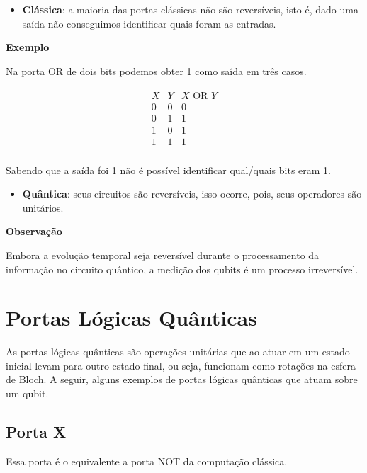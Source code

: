 \begin{itemize}
\tightlist
\item
  \textbf{Clássica}: a maioria das portas clássicas não são reversíveis,
  isto é, dado uma saída não conseguimos identificar quais foram as
  entradas.
\end{itemize}

\textbf{Exemplo}

Na porta OR de dois bits podemos obter 1 como saída em três casos.

\[\begin{aligned}
\begin{array}{cc|c}
    X & Y & X \text{ OR } Y \\
    0 & 0 & 0 \\
    0 & 1 & 1 \\
    1 & 0 & 1 \\
    1 & 1 & 1 \\
\end{array}
\end{aligned}\]

Sabendo que a saída foi 1 não é possível identificar qual/quais bits
eram 1.

\begin{itemize}
\tightlist
\item
  \textbf{Quântica}: seus circuitos são reversíveis, isso ocorre, pois,
  seus operadores são unitários.
\end{itemize}

\textbf{Observação}

Embora a evolução temporal seja reversível durante o processamento da
informação no circuito quântico, a medição dos qubits é um processo
irreversível.

\section{Portas Lógicas Quânticas}\label{sec:portas-quanticas}

As portas lógicas quânticas são operações {unitárias} que ao atuar em um
estado inicial levam para outro estado final, ou seja, funcionam como
rotações na esfera de Bloch.
A seguir, alguns exemplos de portas lógicas quânticas que atuam sobre um qubit.

\subsection{Porta X}\label{subsec:porta-x}

Essa porta é o equivalente a porta NOT da computação clássica.

